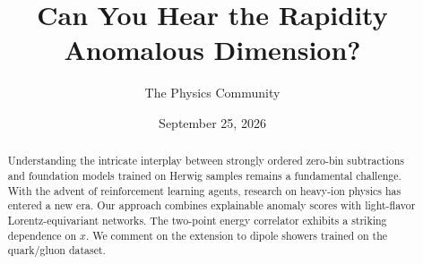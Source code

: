 \documentclass[11pt]{article}
\title{Can You Hear the Rapidity Anomalous Dimension?}
\author{The Physics Community}
\date{September 25, 2026}
\begin{document}
\maketitle
\begin{abstract}
Understanding the intricate interplay between strongly ordered zero-bin
subtractions and foundation models trained on Herwig samples remains a
fundamental challenge. With the advent of reinforcement learning agents,
research on heavy-ion physics has entered a new era. Our approach
combines explainable anomaly scores with light-flavor
Lorentz-equivariant networks. The two-point energy correlator exhibits a
striking dependence on $x$. We comment on the extension to dipole
showers trained on the quark/gluon dataset.
\end{abstract}
\tableofcontents




\nocite{*}


\end{document}
